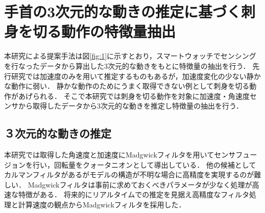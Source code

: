 \section{手首の3次元的な動きの推定に基づく刺身を切る動作の特徴量抽出}
本研究による提案手法は図\ref{fig:1}に示すとおり，スマートウォッチでセンシングを行なったデータから算出した3次元的な動きをもとに特徴量の抽出を行う．
先行研究\cite{kumazawaanalysis}では加速度のみを用いて推定するものもあるが，加速度変化の少ない静かな動作に弱い．
静かな動作のためにうまく取得できない例として刺身を切る動作があげられる．
そこで本研究では刺身を切る動作を対象に加速度・角速度センサから取得したデータから3次元的な動きを推定し特徴量の抽出を行う．





\subsection{３次元的な動きの推定}
本研究では取得した角速度と加速度にMadgwickフィルタを用いてセンサフュージョンを行い，回転量をクォータニオンとして導出している．
他の候補としてカルマンフィルタがあるがモデルの構造が不明な場合に高精度を実現するのが難しい．
Madgwickフィルタは事前に求めておくべきパラメータが少なく処理が高速な特徴がある．
将来的にリアルタイムでの推定を見据え高精度なフィルタ処理と計算速度の観点からMadgwickフィルタを採用した．



